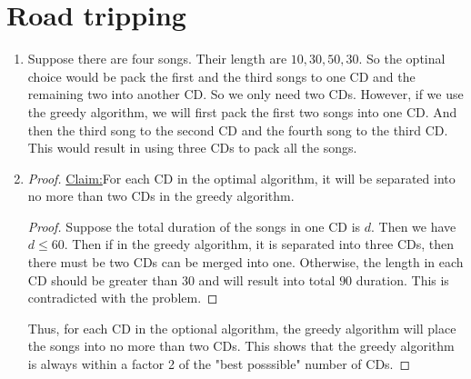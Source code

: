 \documentclass{article}
\newenvironment{claim}[1]{\par\noindent\underline{Claim:}\space#1}{}
\begin{document}
	\section{Road tripping}
	\begin{enumerate}
		\item Suppose there are four songs. Their length are $10, 30, 50, 30$. So the optinal choice would be pack the first and the third songs to one CD and the remaining two into another CD. So we only need two CDs. However, if we use the greedy algorithm, we will first pack the first two songs into one CD. And then the third song to the second CD and the fourth song to the third CD. This would result in using three CDs to pack all the songs.
		\item \begin{proof}\begin{claim} For each CD in the optimal algorithm, it will be separated into no more than two CDs in the greedy algorithm. \end{claim}
		\begin{proof} Suppose the total duration of the songs in one CD is $d$. Then we have $d \leq 60$. Then if in the greedy algorithm, it is separated into three CDs, then there must be two CDs can be merged into one. Otherwise, the length in each CD should be greater than $30$ and will result into total $90$ duration. This is contradicted with the problem. \end{proof}
		Thus, for each CD in the optional algorithm, the greedy algorithm will place the songs into no more than two CDs. This shows that the greedy algorithm is always within a factor 2 of the "best posssible" number of CDs. \end{proof}
	\end{enumerate}
\end{document}
